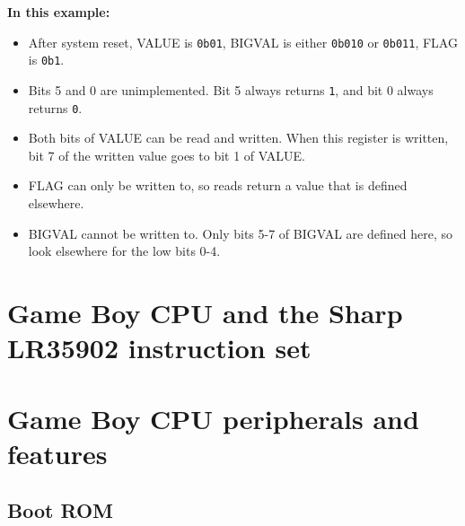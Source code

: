 \documentclass[a4paper, draft, oneside]{memoir}
\newcommand{\bit}[1]{\texttt{#1}}
\newcommand{\bin}[1]{\texttt{0b#1}}
\begin{document}
\begin{register}[H]
  \vspace{3mm}
  \textbf{In this example:}
  \begin{itemize}
    \item{After system reset, VALUE is \bin{01}, BIGVAL is either \bin{010} or \bin{011}, FLAG is \bin{1}.}
    \item{Bits 5 and 0 are unimplemented. Bit 5 always returns \bit{1}, and bit 0 always returns \bit{0}.}
    \item{Both bits of VALUE can be read and written. When this register is written, bit 7 of the written value goes to bit 1 of VALUE.}
    \item{FLAG can only be written to, so reads return a value that is defined elsewhere.}
    \item{BIGVAL cannot be written to. Only bits 5-7 of BIGVAL are defined here, so look elsewhere for the low bits 0-4.}
  \end{itemize}
\end{register}

\clearpage

\tableofcontents

\part{Game Boy CPU and the Sharp LR35902 instruction set}



\part{Game Boy CPU peripherals and features}

\chapter{Boot ROM}
\end{document}
